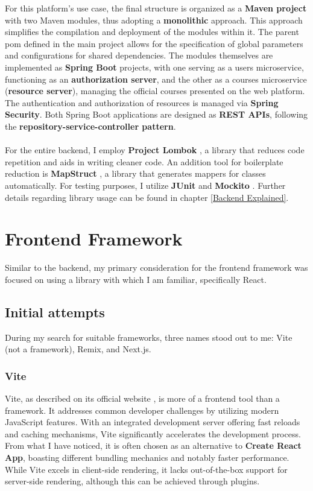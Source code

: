 \noindent For this platform's use case, the final structure is organized as a \textbf{Maven project} with two Maven modules, thus adopting a \textbf{monolithic} approach. This approach simplifies the compilation and deployment of the modules within it. The parent pom defined in the main project allows for the specification of global parameters and configurations for shared dependencies. The modules themselves are implemented as \textbf{Spring Boot} projects, with one serving as a users microservice, functioning as an \textbf{authorization server}, and the other as a courses microservice (\textbf{resource server}), managing the official courses presented on the web platform. The authentication and authorization of resources is managed via \textbf{Spring Security}. Both Spring Boot applications are designed as \textbf{REST APIs}, following the \textbf{repository-service-controller pattern}.
\\\\
For the entire backend, I employ \textbf{Project Lombok} \cite{project-lombok}, a library that reduces code repetition and aids in writing cleaner code. An addition tool for boilerplate reduction is \textbf{MapStruct} \cite{mapstruct}, a library that generates mappers for classes automatically. For testing purposes, I utilize \textbf{JUnit} \cite{junit5} and \textbf{Mockito} \cite{baeldung-mockito}. Further details regarding library usage can be found in chapter \ref{Backend Explained}.

\newpage
\section{Frontend Framework}

Similar to the backend, my primary consideration for the frontend framework was focused on using a library with which I am familiar, specifically React.

\subsection{Initial attempts}

\noindent During my search for suitable frameworks, three names stood out to me: Vite (not a framework), Remix, and Next.js.

\subsubsection{Vite}

\noindent Vite, as described on its official website \cite{vite-guide}, is more of a frontend tool than a framework. It addresses common developer challenges by utilizing modern JavaScript features. With an integrated development server offering fast reloads and caching mechanisms, Vite significantly accelerates the development process. From what I have noticed, it is often chosen as an alternative to \textbf{Create React App}, boasting different bundling mechanics and notably faster performance. While Vite excels in client-side rendering, it lacks out-of-the-box support for server-side rendering, although this can be achieved through plugins.

